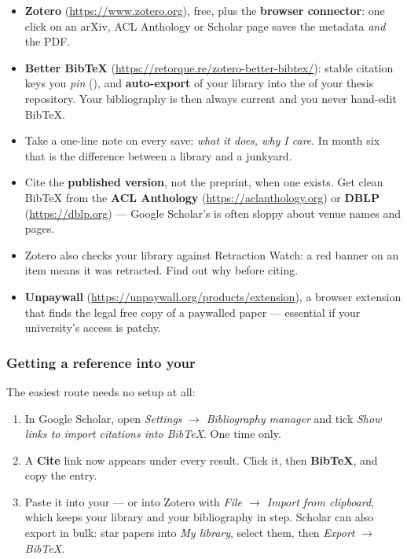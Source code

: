 \documentclass[11pt,a4paper]{article}
\begin{document}
\begin{itemize}
  \item \textbf{Zotero} (\url{https://www.zotero.org}), free, plus the
        \textbf{browser connector}: one click on an arXiv, ACL Anthology or
        Scholar page saves the metadata \emph{and} the PDF.
  \item \textbf{Better BibTeX} (\url{https://retorque.re/zotero-better-bibtex/}):
        stable citation keys you \emph{pin} (), and
        \textbf{auto-export} of your library into the  of your
        thesis repository. Your bibliography is then always current and you
        never hand-edit BibTeX.
  \item Take a one-line note on every save: \emph{what it does, why I care}.
        In month six that is the difference between a library and a junkyard.
  \item Cite the \textbf{published version}, not the preprint, when one exists.
        Get clean BibTeX from the \textbf{ACL Anthology}
        (\url{https://aclanthology.org}) or \textbf{DBLP}
        (\url{https://dblp.org}) --- Google Scholar's is often sloppy about
        venue names and pages.
  \item Zotero also checks your library against Retraction Watch: a red
        banner on an item means it was retracted. Find out why before citing.
  \item \textbf{Unpaywall} (\url{https://unpaywall.org/products/extension}),
        a browser extension that finds the legal free copy of a paywalled
        paper --- essential if your university's access is patchy.
\end{itemize}

\subsubsection*{Getting a reference into your }

The easiest route needs no setup at all:

\begin{enumerate}
  \item In Google Scholar, open \emph{Settings} $\rightarrow$
        \emph{Bibliography manager} and tick \emph{Show links to import
        citations into BibTeX}. One time only.
  \item A \textbf{Cite} link now appears under every result. Click it, then
        \textbf{BibTeX}, and copy the entry.
  \item Paste it into your  --- or into Zotero with
        \emph{File $\rightarrow$ Import from clipboard}, which keeps your
        library and your bibliography in step. Scholar can also export in
        bulk: star papers into \emph{My library}, select them, then
        \emph{Export} $\rightarrow$ \emph{BibTeX}.
\end{enumerate}
\end{document}
